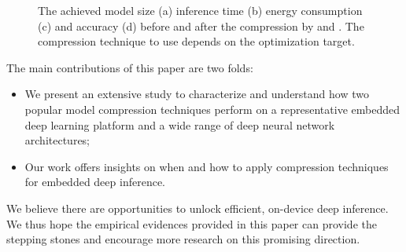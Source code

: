 \begin{figure}[!t]
\centering
{}
\hfill
{}
\hfill
{}
\hfill
{}
\hfill
\caption{The achieved model size (a) inference time (b) energy consumption (c) and accuracy (d) before and after the compression by \quantization and \pruning.
The compression technique to use depends on the optimization target.}
\vspace{-4mm}
\label{fig:motivation}
\end{figure}


The main contributions of this paper are two folds:

\begin{itemize}
\item We present an extensive study to characterize and understand how two popular model compression techniques perform on a
    representative embedded deep learning platform and a wide range of deep neural network architectures;
\item Our work offers insights on when and how to apply compression techniques for embedded deep inference.
\end{itemize}

We believe there are opportunities to unlock efficient, on-device deep inference. We thus hope the empirical evidences provided in this
paper can provide the stepping stones and encourage more research on this promising direction.
